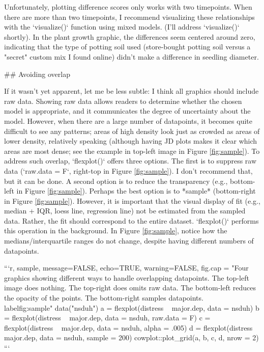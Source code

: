 {{{{{{{Unfortunately, plotting difference scores only works with two timepoints. When there are more than two timepoints, I recommend visualizing these relationships with the `visualize()` function using mixed models. (I'll address `visualize()` shortly). In the plant growth graphic, the differences seem centered around zero, indicating that the type of potting soil used (store-bought potting soil versus a "secret" custom mix I found online) didn't make a difference in seedling diameter. 

## Avoiding overlap

If it wasn't yet apparent, let me be less subtle: I think all graphics should include raw data. Showing raw data allows readers to determine whether the chosen model is appropriate, and it communicates the degree of uncertainty about the model. However, when there are a large number of datapoints, it becomes quite difficult to see any patterns; areas of high density look just as crowded as areas of lower density, relatively speaking (although having JD plots makes it clear which areas are most dense; see the example in top-left image in Figure \ref{fig:sample}). To address such overlap, `flexplot()` offers three options. The first is to suppress raw data (`raw.data = F`, right-top in Figure \ref{fig:sample}). I don't recommend that, but it can be done. A second option is to reduce the transparency (e.g., bottom-left in Figure \ref{fig:sample}). Perhaps the best option is to *sample* (bottom-right in Figure \ref{fig:sample}). However, it is important that the visual display of fit (e.g., median + IQR, loess line, regression line) not be estimated from the sampled data. Rather, the fit should correspond to the entire dataset. `flexplot()` performs this operation in the background. In Figure \ref{fig:sample}, notice how the medians/interquartile ranges do not change, despite having different numbers of datapoints. 

```{r, sample, message=FALSE, echo=TRUE, warning=FALSE, fig.cap = "Four graphics showing different ways to handle overlapping datapoints. The top-left image does nothing. The top-right does omits raw data. The bottom-left reduces the opacity of the points. The bottom-right samples datapoints. \\label{fig:sample}"}
data("nsduh")
a = flexplot(distress ~ major.dep, data = nsduh)
b = flexplot(distress ~ major.dep, data = nsduh, raw.data = F)
c = flexplot(distress ~ major.dep, data = nsduh, alpha = .005)
d = flexplot(distress ~ major.dep, data = nsduh, sample = 200)
cowplot::plot_grid(a, b, c, d, nrow = 2)
```


}}}}}}}

